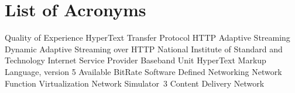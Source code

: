 \section*{List of Acronyms}

\begin{acronym}[CSMA/CA]
	\itemsep0.5pt
	      {Quality of Experience}
	     {HyperText Transfer Protocol}
			{HTTP Adaptive Streaming}  
			{Dynamic Adaptive Streaming over HTTP}  
			{National Institute of Standard and Technology}
			{Internet Service Provider} 
			{Baseband Unit}
		{HyperText Markup Language, version 5} 
			{Available BitRate}
	      {Software Defined Networking}
	      {Network Function Virtualization}
	     {Network Simulator~3}
	      {Content Delivery Network}
\end{acronym}

